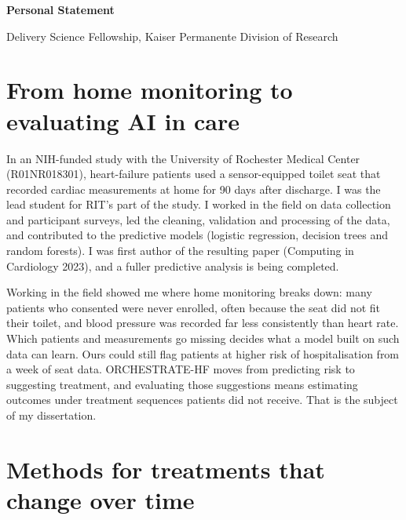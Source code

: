 \documentclass[11pt, letterpaper]{article}
\begin{document}
    \renewcommand{\placelastupdatedtext}{} %
    

    \vspace{0.2 cm}
    \begin{center}
        {\Large\bfseries\color{primaryColor} Personal Statement}

        \vspace{0.1 cm}
        Delivery Science Fellowship, Kaiser Permanente Division of Research
    \end{center}


    \section{From home monitoring to evaluating AI in care}

    In an NIH-funded study with the University of Rochester Medical Center (R01NR018301), heart-failure patients
    used a sensor-equipped toilet seat that recorded cardiac measurements at home for 90 days after discharge. I
    was the lead student for RIT's part of the study. I worked in the field on data collection and participant
    surveys, led the cleaning, validation and processing of the data, and contributed to the predictive models
    (logistic regression, decision trees and random forests). I was first author of the resulting paper
    (Computing in Cardiology 2023), and a fuller predictive analysis is being completed.

    Working in the field showed me where home monitoring breaks down: many patients who consented were never
    enrolled, often because the seat did not fit their toilet, and blood pressure was recorded far less
    consistently than heart rate. Which patients and measurements go missing decides what a model built on such
    data can learn. Ours could still flag patients at higher risk of hospitalisation from a week of seat data.
    ORCHESTRATE-HF moves from predicting risk to suggesting treatment, and evaluating those suggestions means
    estimating outcomes under treatment sequences patients did not receive. That is the subject of my
    dissertation.


    \section{Methods for treatments that change over time}
\end{document}

